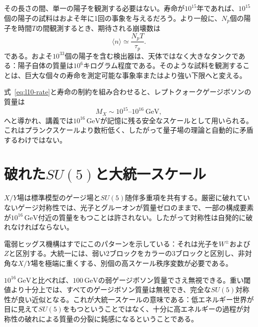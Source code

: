その長さの間、単一の陽子を観測する必要はない。寿命が\(10^{15}\)年であれば、\(10^{15}\)個の陽子の試料はおよそ年に1回の事象を与えるだろう。より一般に、\(N_p\)個の陽子を時間\(T\)の間観測するとき、期待される崩壊数は
\begin{equation}
\langle n\rangle\simeq\frac{N_pT}{\tau_p}.
\label{eq:l10-event-count}
\end{equation}
である。およそ\(10^{33}\)個の陽子を含む検出器は、天体ではなく大きなタンクである：陽子自体の質量は\(10^6\)キログラム程度である。そのような試料を観測することは、巨大な個々の寿命を測定可能な事象率またはより強い下限へと変える。

式~\eqref{eq:l10-rate}と寿命の制約を組み合わせると、レプトクォークゲージボソンの質量は
\begin{equation}
M_X\sim10^{15}\text{--}10^{16}\ \mathrm{GeV},
\label{eq:l10-mx}
\end{equation}
へと導かれ、講義では\(10^{16}\,\mathrm{GeV}\)が記憶に残る安全なスケールとして用いられる。これはプランクスケールより数桁低く、したがって量子場の理論と自動的に矛盾するわけではない。

\section{破れた\texorpdfstring{\(SU(5)\)}{SU(5)}と大統一スケール}

\(X/Y\)場は標準模型のゲージ場と\(SU(5)\)随伴多重項を共有する。厳密に破れていないゲージ対称性では、光子とグルーオンが質量ゼロのままで、一部の構成要素が\(10^{16}\,\mathrm{GeV}\)付近の質量をもつことは許されない。したがって対称性は自発的に破れなければならない。

\begin{classroomqa}
\end{classroomqa}

電弱ヒッグス機構はすでにこのパターンを示している：それは光子を\(W^\pm\)および\(Z\)と区別する。大統一には、弱い\(2\)ブロックをカラーの\(3\)ブロックと区別し、非対角な\(X/Y\)場を極端に重くする、別個の高スケール秩序変数が必要である。

\(10^{16}\,\mathrm{GeV}\)と比べれば、\(100\,\mathrm{GeV}\)の弱ゲージボソン質量でさえ無視できる。重い閾値より十分上では、すべてのゲージボソン質量は無視でき、完全な\(SU(5)\)対称性が良い近似となる。これが大統一スケールの意味である：低エネルギー世界が目に見えて\(SU(5)\)をもつということではなく、十分に高エネルギーの過程が対称性の破れによる質量の分裂に鈍感になるということである。

